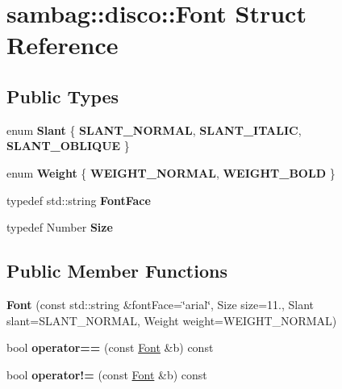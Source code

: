 \hypertarget{structsambag_1_1disco_1_1_font}{
\section{sambag::disco::Font Struct Reference}
\label{structsambag_1_1disco_1_1_font}
}
\subsection*{Public Types}
\begin{DoxyCompactItemize}
\item 
enum {\bfseries Slant} \{ {\bfseries SLANT\_\-NORMAL}, 
{\bfseries SLANT\_\-ITALIC}, 
{\bfseries SLANT\_\-OBLIQUE}
 \}
\item 
enum {\bfseries Weight} \{ {\bfseries WEIGHT\_\-NORMAL}, 
{\bfseries WEIGHT\_\-BOLD}
 \}
\item 
\hypertarget{structsambag_1_1disco_1_1_font_a25660acc9cf6e13c39fcf3c0f5dff2d3}{
typedef std::string {\bfseries FontFace}}
\label{structsambag_1_1disco_1_1_font_a25660acc9cf6e13c39fcf3c0f5dff2d3}

\item 
\hypertarget{structsambag_1_1disco_1_1_font_ab0c00cd26021fec406ea15771569e921}{
typedef Number {\bfseries Size}}
\label{structsambag_1_1disco_1_1_font_ab0c00cd26021fec406ea15771569e921}

\end{DoxyCompactItemize}
\subsection*{Public Member Functions}
\begin{DoxyCompactItemize}
\item 
\hypertarget{structsambag_1_1disco_1_1_font_a5f600618075073745636efbda02b407c}{
{\bfseries Font} (const std::string \&fontFace=\char`\"{}arial\char`\"{}, Size size=11., Slant slant=SLANT\_\-NORMAL, Weight weight=WEIGHT\_\-NORMAL)}
\label{structsambag_1_1disco_1_1_font_a5f600618075073745636efbda02b407c}

\item 
\hypertarget{structsambag_1_1disco_1_1_font_a324ebd0cf1c09a1ca0718fa2a39ddbd1}{
bool {\bfseries operator==} (const \hyperlink{structsambag_1_1disco_1_1_font}{Font} \&b) const }
\label{structsambag_1_1disco_1_1_font_a324ebd0cf1c09a1ca0718fa2a39ddbd1}

\item 
\hypertarget{structsambag_1_1disco_1_1_font_a4792b2676588f6385795a4cf0f0870d3}{
bool {\bfseries operator!=} (const \hyperlink{structsambag_1_1disco_1_1_font}{Font} \&b) const }
\label{structsambag_1_1disco_1_1_font_a4792b2676588f6385795a4cf0f0870d3}

\end{DoxyCompactItemize}

